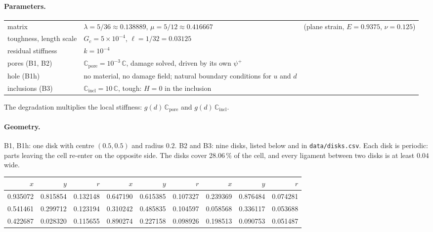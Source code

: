 \documentclass[11pt]{article}
\begin{document}
\paragraph{Parameters.}
\begin{center}
\begin{tabular}{lll}
  \toprule
  matrix & $\lambda = 5/36 \approx 0.138889$, $\mu = 5/12 \approx 0.416667$ & (plane strain, $E = 0.9375$, $\nu = 0.125$) \\
  toughness, length scale & $G_c = 5\times10^{-4}$, $\ell = 1/32 = 0.03125$ & \\
  residual stiffness & $k = 10^{-4}$ & \\
  pores (B1, B2) & $\mathbb C_{\mathrm{pore}} = 10^{-3}\,\mathbb C$, damage solved, driven by its own $\psi^+$ & \\
  hole (B1h) & no material, no damage field; natural boundary conditions for $u$ and $d$ & \\
  inclusions (B3) & $\mathbb C_{\mathrm{incl}} = 10\,\mathbb C$, tough: $H = 0$ in the inclusion & \\
  \bottomrule
\end{tabular}
\end{center}
The degradation multiplies the local stiffness: $g(d)\,\mathbb C_{\mathrm{pore}}$ and $g(d)\,\mathbb C_{\mathrm{incl}}$.

\paragraph{Geometry.} B1, B1h: one disk with centre $(0.5, 0.5)$ and radius $0.2$. B2 and B3: nine disks, listed below
and in \texttt{data/disks.csv}. Each disk is periodic: parts leaving the cell re-enter on the opposite side. The disks
cover 28.06\,\% of the cell, and every ligament between two disks is at least $0.04$ wide.
\begin{center}
\small
\begin{tabular}{rrr@{\qquad}rrr@{\qquad}rrr}
  \toprule
  $x$ & $y$ & $r$ & $x$ & $y$ & $r$ & $x$ & $y$ & $r$ \\
  \midrule
  0.935072 & 0.815854 & 0.132148 & 0.647190 & 0.615385 & 0.107327 & 0.239369 & 0.876484 & 0.074281 \\
  0.541461 & 0.299712 & 0.123194 & 0.310242 & 0.485835 & 0.104597 & 0.058568 & 0.336117 & 0.053688 \\
  0.422687 & 0.028320 & 0.115655 & 0.890274 & 0.227158 & 0.098926 & 0.198513 & 0.090753 & 0.051487 \\
  \bottomrule
\end{tabular}
\end{center}
\end{document}
